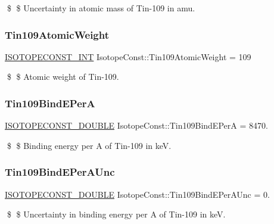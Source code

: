 \$ \$ Uncertainty in atomic mass of Tin-\/109 in amu. \mbox{\label{group___isotope_const-_tin-_sn109_ga8690df36b418a19e1446d7a9ad2bf14a}} 
\subsubsection{\texorpdfstring{Tin109\+Atomic\+Weight}{Tin109AtomicWeight}}
{\footnotesize\ttfamily \mbox{\hyperlink{group___isotope_const-_macros_ga5f18360b3e99483a35c32d789e62621c}{I\+S\+O\+T\+O\+P\+E\+C\+O\+N\+S\+T\+\_\+\+I\+NT}} Isotope\+Const\+::\+Tin109\+Atomic\+Weight = 109}

\$ \$ Atomic weight of Tin-\/109. \mbox{\label{group___isotope_const-_tin-_sn109_ga776af5fb9eab381848bb9fb99721522f}} 
\subsubsection{\texorpdfstring{Tin109\+Bind\+E\+PerA}{Tin109BindEPerA}}
{\footnotesize\ttfamily \mbox{\hyperlink{group___isotope_const-_macros_ga8f45a7272ce02c0b4c65c44636ed719a}{I\+S\+O\+T\+O\+P\+E\+C\+O\+N\+S\+T\+\_\+\+D\+O\+U\+B\+LE}} Isotope\+Const\+::\+Tin109\+Bind\+E\+PerA = 8470.}

\$ \$ Binding energy per A of Tin-\/109 in keV. \mbox{\label{group___isotope_const-_tin-_sn109_ga118387ca6762910d50feb4a6f09a9bd3}} 
\subsubsection{\texorpdfstring{Tin109\+Bind\+E\+Per\+A\+Unc}{Tin109BindEPerAUnc}}
{\footnotesize\ttfamily \mbox{\hyperlink{group___isotope_const-_macros_ga8f45a7272ce02c0b4c65c44636ed719a}{I\+S\+O\+T\+O\+P\+E\+C\+O\+N\+S\+T\+\_\+\+D\+O\+U\+B\+LE}} Isotope\+Const\+::\+Tin109\+Bind\+E\+Per\+A\+Unc = 0.}

\$ \$ Uncertainty in binding energy per A of Tin-\/109 in keV. \mbox{\label{group___isotope_const-_tin-_sn109_ga0f6fbebf5f3f00aad521fb4579fe53cb}} 
